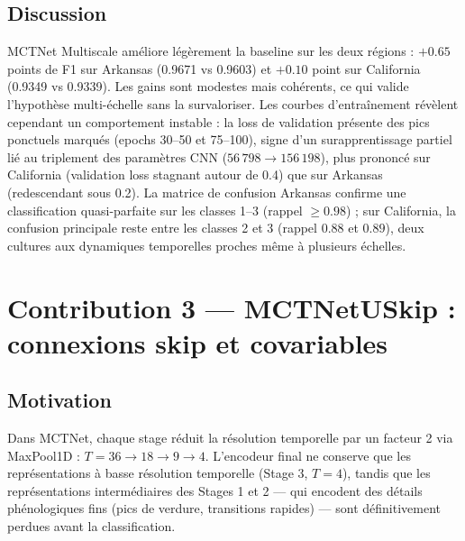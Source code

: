 
\subsection{Discussion}
\label{subsec:ms_discussion}

MCTNet Multiscale améliore légèrement la baseline sur les deux régions :
$+0.65$ points de F1 sur Arkansas (0.9671 vs 0.9603) et $+0.10$ point sur
California (0.9349 vs 0.9339).
Les gains sont modestes mais cohérents, ce qui valide l'hypothèse multi-échelle
sans la survaloriser.
Les courbes d'entraînement révèlent cependant un comportement instable :
la loss de validation présente des pics ponctuels marqués (epochs 30--50 et
75--100), signe d'un surapprentissage partiel lié au triplement des paramètres
CNN ($56\,798 \to 156\,198$), plus prononcé sur California (validation loss
stagnant autour de 0.4) que sur Arkansas (redescendant sous 0.2).
La matrice de confusion Arkansas confirme une classification quasi-parfaite
sur les classes 1--3 (rappel $\geq 0.98$) ; sur California, la confusion
principale reste entre les classes 2 et 3 (rappel $0.88$ et $0.89$),
deux cultures aux dynamiques temporelles proches même à plusieurs échelles.

\section{Contribution 3 — MCTNetUSkip : connexions skip et covariables}
\label{sec:uskip}

\subsection{Motivation}

Dans MCTNet, chaque stage réduit la résolution temporelle par un facteur 2
via MaxPool1D : $T=36 \to 18 \to 9 \to 4$. L'encodeur final ne conserve que
les représentations à basse résolution temporelle (Stage 3, $T=4$), tandis que
les représentations intermédiaires des Stages 1 et 2 — qui encodent des
détails phénologiques fins (pics de verdure, transitions rapides) — sont
définitivement perdues avant la classification.

